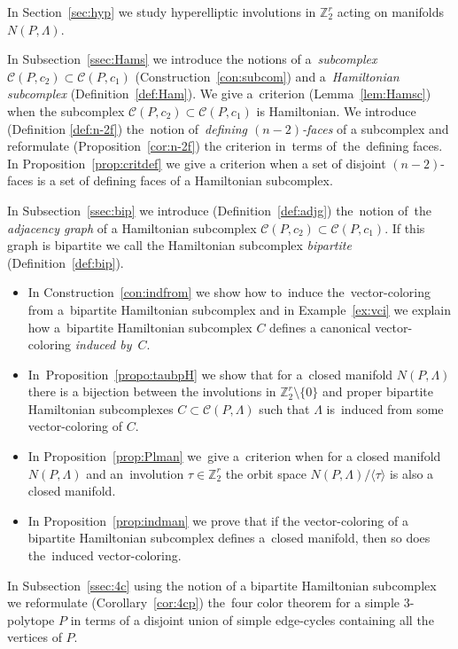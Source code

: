 \documentclass[12pt]{amsart}
\theoremstyle{definition}
\theoremstyle{remark}
\begin{document}
In Section~\ref{sec:hyp} we study hyperelliptic involutions in $\mathbb Z_2^r$ acting 
on manifolds $N(P,\Lambda)$. 

In Subsection~\ref{ssec:Hams} we introduce 
the notions of a~{\it subcomplex} $\mathcal{C}(P,c_2)\subset \mathcal{C}(P,c_1)$ (Construction~\ref{con:subcom})
and a~{\it Hamiltonian subcomplex} (Definition~\ref{def:Ham}). We give a~criterion  (Lemma~\ref{lem:Hamsc})
when the subcomplex $\mathcal{C}(P,c_2)\subset \mathcal{C}(P,c_1)$  is Hamiltonian. We introduce 
(Definition \ref{def:n-2f}) the~notion of~{\it defining $(n-2)$-faces} of a subcomplex and 
reformulate (Proposition~\ref{cor:n-2f}) the criterion in~terms of~the~defining faces. In 
Proposition~\ref{prop:critdef} we give a criterion when a set of disjoint $(n-2)$-faces is a set of defining
faces of a Hamiltonian subcomplex.

In Subsection~\ref{ssec:bip} we introduce (Definition~\ref{def:adjg}) the~notion of~the
{\it adjacency graph} of a Hamiltonian subcomplex $\mathcal{C}(P,c_2)\subset \mathcal{C}(P,c_1)$.
If this graph is bipartite we call the Hamiltonian subcomplex {\it bipartite} (Definition~\ref{def:bip}).
\begin{itemize}
\item In Construction~\ref{con:indfrom} we show how to~induce the~vector-coloring from 
a~bipartite Hamiltonian subcomplex and in Example~\ref{ex:vci} we explain how a~bipartite Hamiltonian
subcomplex $C$ defines a canonical vector-coloring {\it induced by}~$C$. 
\item  In~Proposition~\ref{propo:taubpH}
we show that for a~closed manifold $N(P,\Lambda)$ there is a bijection 
between the involutions in $\mathbb Z_2^r\setminus\{0\}$ and proper bipartite
Hamiltonian subcomplexes $C\subset \mathcal{C}(P,\Lambda)$ such that $\Lambda$
is~induced from some vector-coloring of $C$. 
\item In Proposition~\ref{prop:Plman} we~give 
a~criterion when for a closed manifold $N(P,\Lambda)$ and an~involution $\tau\in\mathbb Z_2^r$
the orbit space $N(P,\Lambda)/\langle\tau\rangle$ is also a closed manifold. 
\item In Proposition~\ref{prop:indman}
we prove that if the vector-coloring of a bipartite Hamiltonian subcomplex defines a~closed manifold, 
then so does the~induced vector-coloring.
\end{itemize}

In Subsection~\ref{ssec:4c} using the notion
of a bipartite Hamiltonian subcomplex we reformulate (Corollary~\ref{cor:4cp}) the~four color theorem
for a simple $3$-polytope $P$ in terms of a disjoint union of simple edge-cycles containing all the vertices of $P$.
\end{document}
